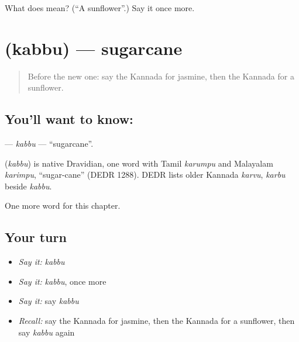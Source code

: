 \begin{tcolorbox}[breakable,colback=teal!4,colframe=teal!35!black,title={Before you move on}]
What does  mean? (\textquotedblleft{}A sunflower\textquotedblright{}.) Say it once more.
\end{tcolorbox}
\section[\texorpdfstring{\kn{ಕಬ್ಬು} (kabbu)}{ಕಬ್ಬು (kabbu)}]{ (kabbu) — sugarcane}

\label{lesson:KA-C225-kabbu}



\begin{quote}
Before the new one: say the Kannada for jasmine, then the Kannada for a sunflower.
\end{quote}

\subsection*{You'll want to know: }
\textbf{} — \emph{kabbu} — \textquotedblleft{}sugarcane\textquotedblright{}.

\begin{cousinweb}
\textbf{} (\emph{kabbu}) is native Dravidian, one word with Tamil \emph{karumpu} and Malayalam \emph{karimpu}, \textquotedblleft{}sugar-cane\textquotedblright{} (DEDR 1288). DEDR lists older Kannada \emph{karvu}, \emph{karbu} beside \emph{kabbu}.
\end{cousinweb}

\begin{grammarlens}[title={What you've built}]
One more word for this chapter.
\end{grammarlens}

\subsection*{Your turn}
\begin{itemize}
\raggedright
  \item \emph{Say it:} \emph{kabbu}
  \item \emph{Say it:} \emph{kabbu}, once more
  \item \emph{Say it:} say \emph{kabbu}
  \item \emph{Recall:} say the Kannada for jasmine, then the Kannada for a sunflower, then say \emph{kabbu} again
\end{itemize}

